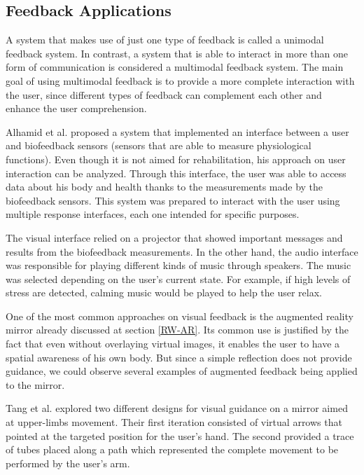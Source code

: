 \subsection{Feedback Applications}

A system that makes use of just one type of feedback is called a unimodal feedback system. 
In contrast, a system that is able to interact in more than one form of communication is considered a multimodal feedback system.
The main goal of using multimodal feedback is to provide a more complete interaction with the user, 
since different types of feedback can complement each other and enhance the user comprehension\cite{Sigrist2013}.

Alhamid et al. \cite{Alhamid2012a} proposed a system
that implemented an interface between a user and biofeedback sensors (sensors that are able 
to measure physiological functions). Even though it is not aimed for rehabilitation, his approach on user interaction can be analyzed.
Through this interface, the user was able to access data about his body and health thanks to the measurements made by the biofeedback sensors.
This system was prepared to interact with the user using multiple response interfaces, each one intended for specific purposes.

The visual interface relied on a projector that showed important messages and results from the biofeedback measurements.
In the other hand, the audio interface was responsible for playing different kinds of music through speakers. 
The music was selected depending on the user's current state. For example, if high levels of stress are detected, 
calming music would be played to help the user relax.

One of the most common approaches on visual feedback is the augmented reality mirror already discussed at section \ref{RW-AR}. Its common
use is justified by the fact that even without overlaying virtual images, it enables the user to have a spatial awareness of his own body.
But since a simple reflection does not provide guidance, we could observe several examples of augmented feedback being applied to the mirror.

Tang et al. \cite{Tang2014a} explored two different designs for visual guidance on a mirror aimed at upper-limbs movement.
Their first iteration consisted of virtual arrows that pointed at the targeted position for the user's hand.
The second provided a trace of tubes placed along a path which represented the complete movement to be performed by the user's arm.

